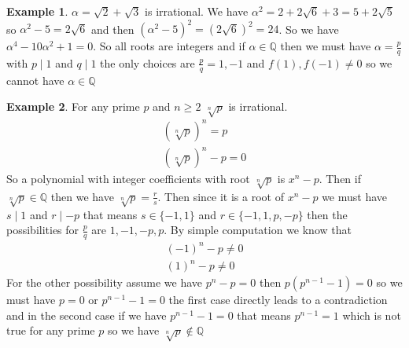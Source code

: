 \documentclass[16pt,a4paper]{article}
\theoremstyle{definition}
\newtheorem{example}{Example}
\newcommand{\Q}{\mathbb{Q}}
\begin{document}
\begin{example}
$\alpha = \sqrt{2} + \sqrt{3}$ is irrational. We have $\alpha^2 = 2 + 2\sqrt{6} + 3 = 5+2\sqrt{5}$ so $\alpha^2 - 5 = 2\sqrt{6}$ and then $(\alpha^2 -5)^2 = (2\sqrt{6})^2 = 24$. So we have $\alpha^4 -10\alpha^2 +1 =0$. So all roots are integers and if $\alpha \in \Q$ then we must have $\alpha = \frac{p}{q}$ with $p\mid 1$ and $q\mid 1$ the only choices are $\frac{p}{q} = 1,-1$ and $f(1),f(-1)\neq 0$ so we cannot have $\alpha\in \Q$ 
\end{example}

\begin{example}
For any prime $p$ and $n\geq 2$ $\sqrt[n]{p}$ is irrational. 
\begin{align*}
\left(\sqrt[n]{p}\right)^n = p \\
\left(\sqrt[n]{p}\right)^n - p = 0
\end{align*}
So a polynomial with integer coefficients with root $\sqrt[n]{p}$ is $x^n - p$. Then if $\sqrt[n]{p}\in \Q$ then we have $\sqrt[n]{p} = \frac{r}{s}$. Then since it is a root of $x^n - p$ we must have $s\mid 1$ and $r\mid -p$ that means $s\in \{-1,1\}$ and $r\in \{-1,1,p,-p\}$ then the possibilities for $\frac{p}{q}$ are $1,-1,-p,p$. By simple computation we know that 
\begin{align*}
(-1)^n - p \neq 0 \\
(1)^n - p \neq 0 
\end{align*}
For the other possibility assume we have $p^n - p = 0$  then $p(p^{n-1}-1) = 0$ so we must have $p=0$ or $p^{n-1} - 1 =0$ the first case directly leads to a contradiction and in the second case if we have $p^{n-1} - 1 = 0$ that means $p^{n-1} = 1$ which is not true for any prime $p$ so we  have $\sqrt[n]{p}\notin \Q$ 
\end{example}
\end{document}
